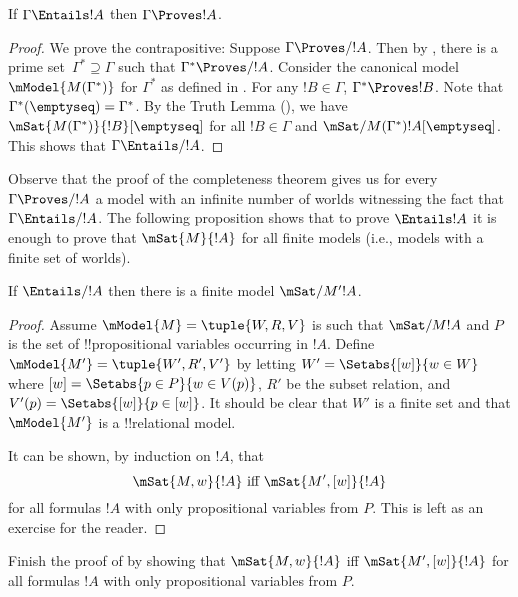 \documentclass[../../../include/open-logic-section]{subfiles}
\begin{document}


\begin{thm}
  If $\Gamma \Entails !A$ then $\Gamma \Proves !A$.
\end{thm}

\begin{proof}
  We prove the contrapositive: Suppose $\Gamma \Proves/ !A$. Then by
  , there is a prime set~$\Gamma^*
  \supseteq \Gamma$ such that $\Gamma^* \Proves/ !A$. Consider the
  canonical model~$\mModel{M(\Gamma^*)}$ for $\Gamma^*$ as defined in
  . For any $!B \in \Gamma$, $\Gamma^*
  \Proves !B$. Note that $\Gamma^*(\emptyseq) = \Gamma^*$. By the Truth
  Lemma (), we have
  $\mSat{M(\Gamma^*)}{!B}[\emptyseq]$ for all $!B \in \Gamma$ and
  $\mSat/{M(\Gamma^*)}{!A}[\emptyseq]$. This shows that $\Gamma
  \Entails/ !A$.
\end{proof}

Observe that the proof of the completeness theorem gives us for 
every $\Gamma \Proves/ !A$ a model with an infinite number of worlds 
witnessing the fact that $\Gamma \Entails/ !A$. The following proposition shows 
that to prove $\Entails !A$ it is enough to prove that $\mSat{M}{!A}$ 
for all finite models (i.e., models with a finite set of worlds).

\begin{thm}
  If $\Entails/ !A$ then there is a finite model $\mSat/{M'}{!A}$.
\end{thm}
\begin{proof}
  Assume $\mModel{M}=\tuple{W, R, V}$ is such that $\mSat/{M}{!A}$ and $P$ 
  is the set of !!{propositional variable}s occurring in $!A$. Define
  $\mModel{M'}=\tuple{W', R', V'}$ by letting $W' = \Setabs{[w]}{w \in W}$ 
  where $[w] = \Setabs{p \in P}{w \in V(p)}$, $R'$ be the subset relation, 
  and $V'(p)=\Setabs{[w]}{p \in [w]}$. It should be clear that $W'$ is a 
  finite set and that $\mModel{M'}$ is a !!{relational model}.

  It can be shown, by induction on $!A$, that 
  $$ \mSat{M,w}{!A} \text{ iff } \mSat{M',[w]}{!A}$$
  for all formulas $!A$ with only propositional variables from $P$. This is left as an exercise for the reader.
\end{proof}

\begin{prob}
Finish the proof of  by showing that $\mSat{M,w}{!A}$ iff 
$\mSat{M',[w]}{!A}$ for all formulas $!A$ with only propositional variables from $P$. 
\end{prob}
\end{document}
